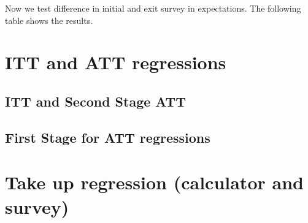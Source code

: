 \documentclass[12pt]{article}
\theoremstyle{named}
\newcommand{\folder}{./Effect}
\begin{document}
\pagebreak

Now we test difference in initial and exit survey in expectations. The following table shows the results.

\begin{center}
\scriptsize{}
\end{center}

\pagebreak

\section{ITT and ATT regressions}

\begin{landscape}
\subsection*{ITT and Second Stage ATT}

\begin{center}
\scriptsize{}
\end{center}

\end{landscape}

\pagebreak


\subsection*{First Stage for ATT regressions}

\begin{center}
\scriptsize{}
\end{center}


\section{Take up regression (calculator and survey)}


\begin{center}
\scriptsize{}
\end{center}


\end{document}
